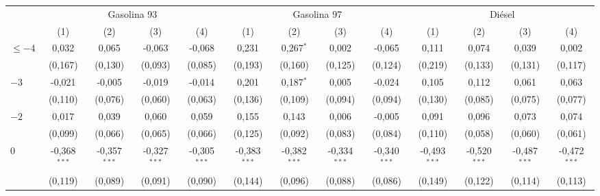\begingroup
\centering
\begin{tabular}{lcccccccccccc}
   \toprule
 & \multicolumn{4}{c}{Gasolina 93} & \multicolumn{4}{c}{Gasolina 97} & \multicolumn{4}{c}{Diésel}\\
\cmidrule(lr){2-5} \cmidrule(lr){6-9} \cmidrule(lr){10-13}
 & (1) & (2) & (3) & (4) & (1) & (2) & (3) & (4) & (1) & (2) & (3) & (4)\\
   \midrule
   $\leq -4$               &  0{,}032           &  0{,}065           &  -0{,}063          &  -0{,}068 &  0{,}231           &  0{,}267$^{*}$     &  0{,}002           &  -0{,}065 &  0{,}111           &  0{,}074           &  0{,}039           &  0{,}002\\
                           &  (0{,}167)         &  (0{,}130)         &  (0{,}093)         &  (0{,}085) &  (0{,}193)         &  (0{,}160)         &  (0{,}125)         &  (0{,}124) &  (0{,}219)         &  (0{,}133)         &  (0{,}131)         &  (0{,}117)\\
   $-3$                    &  -0{,}021          &  -0{,}005          &  -0{,}019          &  -0{,}014 &  0{,}201           &  0{,}187$^{*}$     &  0{,}005           &  -0{,}024 &  0{,}105           &  0{,}112           &  0{,}061           &  0{,}063\\
                           &  (0{,}110)         &  (0{,}076)         &  (0{,}060)         &  (0{,}063) &  (0{,}136)         &  (0{,}109)         &  (0{,}094)         &  (0{,}094) &  (0{,}130)         &  (0{,}085)         &  (0{,}075)         &  (0{,}077)\\
   $-2$                    &  0{,}017           &  0{,}039           &  0{,}060           &  0{,}059 &  0{,}155           &  0{,}143           &  0{,}006           &  -0{,}005 &  0{,}091           &  0{,}096           &  0{,}073           &  0{,}074\\
                           &  (0{,}099)         &  (0{,}066)         &  (0{,}065)         &  (0{,}066) &  (0{,}125)         &  (0{,}092)         &  (0{,}083)         &  (0{,}084) &  (0{,}110)         &  (0{,}058)         &  (0{,}060)         &  (0{,}061)\\
   $0$                     &  -0{,}368$^{***}$  &  -0{,}357$^{***}$  &  -0{,}327$^{***}$  &  -0{,}305$^{***}$ &  -0{,}383$^{***}$  &  -0{,}382$^{***}$  &  -0{,}334$^{***}$  &  -0{,}340$^{***}$ &  -0{,}493$^{***}$  &  -0{,}520$^{***}$  &  -0{,}487$^{***}$  &  -0{,}472$^{***}$\\
                           &  (0{,}119)         &  (0{,}089)         &  (0{,}091)         &  (0{,}090) &  (0{,}144)         &  (0{,}096)         &  (0{,}088)         &  (0{,}086) &  (0{,}149)         &  (0{,}122)         &  (0{,}114)         &  (0{,}113)\\

\end{tabular}
